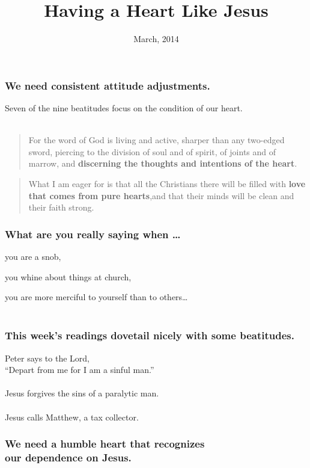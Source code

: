 \documentclass{beamer}
\title{Having a Heart Like Jesus}
\date{March, 2014}
\begin{document}
\frame{\titlepage}


\begin{frame}
\frametitle{We need consistent attitude adjustments.}
Seven of the nine beatitudes focus on the condition of our heart.\\~\\
\begin{quote}
For the word of God is living and active, sharper than any two-edged sword, piercing to the division of soul and of spirit, of joints and of marrow, and \textbf{discerning the thoughts and intentions of the heart}.

\end{quote}

\begin{quote}
What I am eager for is that all the Christians there will be filled with \textbf{love that comes from pure hearts},and that their minds will be clean and their faith strong.

\end{quote}
\end{frame}
\begin{frame}

\frametitle{What are you really saying when \dots}

you are a snob,

you whine about things at church,

you are more merciful to yourself than to others\dots\\~\\

\centering{}

\end{frame}


\begin{frame}
\frametitle{This week's readings dovetail nicely with some beatitudes.}

Peter says to the Lord,\\``Depart from me for I am a sinful man.''\\~\\
Jesus forgives the sins of a paralytic man.\\~\\
Jesus calls Matthew, a tax collector.

\end{frame}

\begin{frame}
\frametitle{We need a humble heart that recognizes\\our dependence on Jesus.}
\end{frame}
\end{document}
